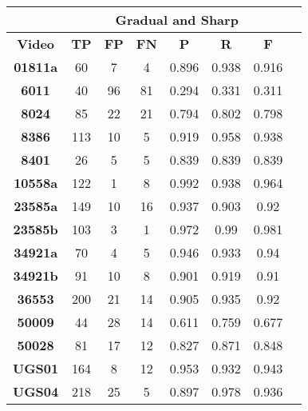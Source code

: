 \documentclass[journal]{IEEEtran}
\begin{document}
\begin{table}[h]
\centering

\begin{tabular}{|c|c|c|c|c|c|c|c|}
\hline
& \multicolumn{6}{c|}{\textbf{Gradual and Sharp}}  \\ \hline
\textbf{Video}  & \textbf{TP} & \textbf{FP} & \textbf{FN} & \textbf{P} & \textbf{R} & \textbf{F} \\ \hline
\textbf{01811a}     & 60          & 7           & 4           & 0.896      & 0.938      & 0.916      \\ \hline
\textbf{6011}       & 40          & 96          & 81          & 0.294      & 0.331      & 0.311      \\ \hline
\textbf{8024}       & 85          & 22          & 21          & 0.794      & 0.802      & 0.798      \\ \hline
\textbf{8386}       & 113         & 10          & 5           & 0.919      & 0.958      & 0.938      \\ \hline
\textbf{8401}       & 26          & 5           & 5           & 0.839      & 0.839      & 0.839      \\ \hline
\textbf{10558a}     & 122         & 1           & 8           & 0.992      & 0.938      & 0.964      \\ \hline
\textbf{23585a}     & 149         & 10          & 16          & 0.937      & 0.903      & 0.92       \\ \hline
\textbf{23585b}     & 103         & 3           & 1           & 0.972      & 0.99       & 0.981      \\ \hline
\textbf{34921a}     & 70          & 4           & 5           & 0.946      & 0.933      & 0.94       \\ \hline
\textbf{34921b}     & 91          & 10          & 8           & 0.901      & 0.919      & 0.91       \\ \hline
\textbf{36553}      & 200         & 21          & 14          & 0.905      & 0.935      & 0.92       \\ \hline
\textbf{50009}      & 44          & 28          & 14          & 0.611      & 0.759      & 0.677      \\ \hline
\textbf{50028}      & 81          & 17          & 12          & 0.827      & 0.871      & 0.848      \\ \hline
\textbf{UGS01}      & 164         & 8           & 12          & 0.953      & 0.932      & 0.943      \\ \hline
\textbf{UGS04}      & 218         & 25          & 5           & 0.897      & 0.978      & 0.936      \\ \hline

\end{tabular}
\end{table}
\end{document}
